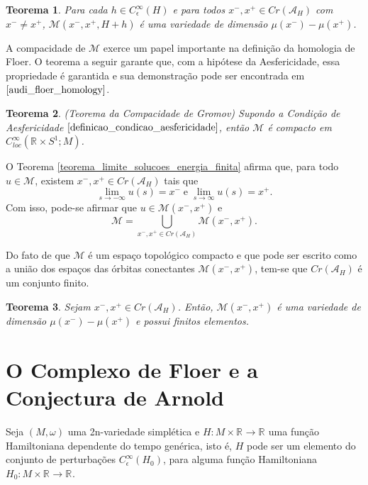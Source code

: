 \documentclass[12pt]{book}
\newtheorem{teorema}{Teorema}[section]
\newcommand{\circulo}{S^{1}}
\newcommand{\energiafinitaM}{\mathcal{M}}
\newcommand{\energiafinitaMconectante}{\energiafinitaM(x^{-}, x^{+})}
\newcommand{\funcionalH}{\mathcal{A}_{H}}
\newcommand{\perturbacaoHamiltoniana}[1]{C^{\infty}_{\epsilon}(#1)}
\newcommand{\pontoscriticos}[1]{\textit{Cr}(#1)}
\newcommand{\retacartesianocirculo}{\real{} \times \circulo}
\newcommand{\real}[1]{\mathbb{R}^{#1}}
\newcommand{\reta}{\real{}}
\begin{document}
	\begin{teorema}
		Para cada $h \in \perturbacaoHamiltoniana{H}$ e para todos $x^{-}, x^{+}\in \pontoscriticos{\funcionalH}$ com $x^{-}\neq x^{+}$, $\energiafinitaM(x^{-}, x^{+}, H+h)$ é uma variedade de dimensão $\mu(x^{-})-\mu(x^{+})$.
	\end{teorema} 
	
	A compacidade de $\energiafinitaM$ exerce um papel importante na definição da homologia de Floer. O teorema a seguir garante que, com a hipótese da Aesfericidade, essa propriedade é garantida e sua demonstração pode ser encontrada em $\cite{audi_floer_homology}$.
	
	\begin{teorema}\label{teorema_compacidade_gromov}
		(Teorema da Compacidade de Gromov) Supondo a Condição de Aesfericidade $\ref{definicao_condicao_aesfericidade}$, então $\energiafinitaM$ é compacto em $C^{\infty}_{loc}(\retacartesianocirculo; M)$.
	\end{teorema}
	
	O Teorema \ref{teorema_limite_solucoes_energia_finita} afirma que, para todo $u\in \energiafinitaM$, existem $x^{-}, x^{+}\in \pontoscriticos{\funcionalH}$ tais que 
	$$
	\lim_{s\to -\infty}u(s)=x^{-}\; \text{e} \; \lim_{s\to \infty}u(s)=x^{+}.
	$$
	Com isso, pode-se afirmar que $u\in \energiafinitaMconectante$ e 
	$$
	\energiafinitaM = \bigcup_{x^{-}, x^{+}\in  \pontoscriticos{\funcionalH}}\energiafinitaMconectante.
	$$
	
	Do fato de que $\energiafinitaM$ é um espaço topológico compacto e que pode ser escrito como a união dos espaços das órbitas conectantes $\energiafinitaMconectante$, tem-se que $\pontoscriticos{\funcionalH}$ é um conjunto finito.
	
	\begin{teorema}\label{teorema_orbitas_conectantes_finitas}
		Sejam $x^{-}, x^{+} \in \pontoscriticos{\funcionalH}$. Então, $\energiafinitaMconectante$ é uma variedade de dimensão $\mu(x^{-})-\mu(x^{+})$ e possui finitos elementos.
	\end{teorema}
	
	\section{O Complexo de Floer e a Conjectura de Arnold}
	
	Seja $(M,\omega)$ uma 2n-variedade simplética e $H: M\times \reta\to \reta$ uma função Hamiltoniana dependente do tempo genérica, isto é, $H$ pode ser um elemento do conjunto de perturbações $\perturbacaoHamiltoniana{H_{0}}$, para alguma função Hamiltoniana $H_{0}:M\times \reta \to \reta$.
	
\end{document}
